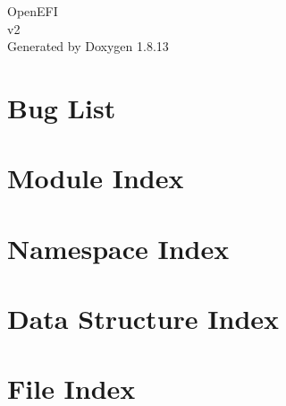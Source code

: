 \documentclass[twoside]{book}
\newcommand{\+}{\discretionary{\mbox{\scriptsize$\hookleftarrow$}}{}{}}
\newcommand{\clearemptydoublepage}{%
  \newpage{\pagestyle{empty}\cleardoublepage}%
}
\begin{document}
\hypersetup{pageanchor=false,
             bookmarksnumbered=true,
             pdfencoding=unicode
            }
\begin{titlepage}
\vspace*{7cm}
\begin{center}%
{\Large Open\+E\+FI \\[1ex]\large v2 }\\
\vspace*{1cm}
{\large Generated by Doxygen 1.8.13}\\
\end{center}
\end{titlepage}
\clearemptydoublepage
{}
\tableofcontents
\clearemptydoublepage
{}
\hypersetup{pageanchor=true}

\chapter{Bug List}
\label{bug}

\chapter{Module Index}

\chapter{Namespace Index}

\chapter{Data Structure Index}

\chapter{File Index}

\end{document}
